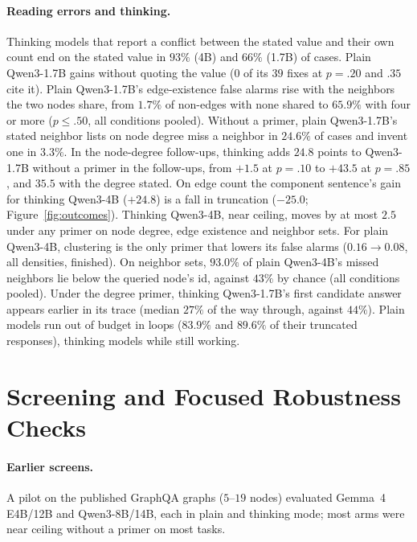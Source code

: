 \documentclass[11pt]{article}
\begin{document}
\paragraph{Reading errors and thinking.} Thinking models that report a conflict between the stated value and their own count end on the stated value in $93\%$ (4B) and $66\%$ (1.7B) of cases. %
Plain Qwen3-1.7B gains without quoting the value ($0$ of its $39$ fixes at $p=.20$ and $.35$ cite it). %
Plain Qwen3-1.7B's edge-existence false alarms rise with the neighbors the two nodes share, from $1.7\%$ of non-edges with none shared to $65.9\%$ with four or more ($p\leq.50$, all conditions pooled). %
Without a primer, plain Qwen3-1.7B's stated neighbor lists on node degree miss a neighbor in $24.6\%$ of cases and invent one in $3.3\%$. %
In the node-degree follow-ups, thinking adds $24.8$ points to Qwen3-1.7B without a primer in the follow-ups, from $+1.5$ at $p=.10$ to $+43.5$ at $p=.85$, and $35.5$ with the degree stated. %
On edge count the component sentence's gain for thinking Qwen3-4B ($+24.8$) is a fall in truncation ($-25.0$; Figure~\ref{fig:outcomes}). %
Thinking Qwen3-4B, near ceiling, moves by at most $2.5$ under any primer on node degree, edge existence and neighbor sets. %
For plain Qwen3-4B, clustering is the only primer that lowers its false alarms ($0.16\to0.08$, all densities, finished). %
On neighbor sets, $93.0\%$ of plain Qwen3-4B's missed neighbors lie below the queried node's id, against $43\%$ by chance (all conditions pooled). %
Under the degree primer, thinking Qwen3-1.7B's first candidate answer appears earlier in its trace (median $27\%$ of the way through, against $44\%$). %
Plain models run out of budget in loops ($83.9\%$ and $89.6\%$ of their truncated responses), thinking models while still working. %


\section{Screening and Focused Robustness Checks}
\label{app:pilot}
\label{app:robust}

\paragraph{Earlier screens.} A pilot on the published GraphQA graphs ($5$--$19$ nodes) evaluated Gemma~4 E4B/12B and Qwen3-8B/14B, each in plain and thinking mode; most arms were near ceiling without a primer on most tasks.
\end{document}
